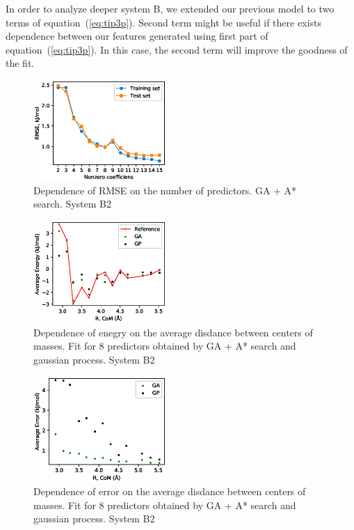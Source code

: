 \documentclass[aps,prl,reprint,amsmath,amssymb,nature]{revtex4-1}
\begin{document}
In order to analyze deeper system B, we extended our previous model to two terms of equation~(\ref{eq:tip3p}). Second term might be useful if there exists dependence between our features generated using first part of equation~(\ref{eq:tip3p}). In this case, the second term will improve the goodness of the fit.

\begin{figure}
\includegraphics[width=0.45\textwidth]{media/B2_GA_PATH_RMSE.eps}
\caption{Dependence of RMSE on the number of predictors. GA + A* search. System B2}\label{Fig:B2_RMSE}
\end{figure}

\begin{figure}
\includegraphics[width=0.45\textwidth]{media/B2_Energy_8_predictors.eps}
\caption{Dependence of enegry on the average disdance between centers of masses. Fit for 8 predictors obtained by GA + A* search and gaussian process. System B2}\label{Fig:B2_Energy}
\end{figure}

\begin{figure}
\includegraphics[width=0.45\textwidth]{media/B2_Error_8_predictors.eps}
\caption{Dependence of error on the average disdance between centers of masses. Fit for 8 predictors obtained by GA + A* search and gaussian process. System B2}\label{Fig:B2_RMSE_8_predictors}
\end{figure}
\end{document}
